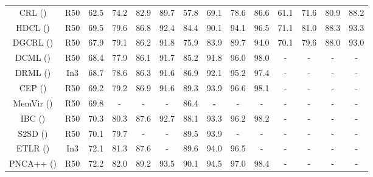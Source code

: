 \documentclass[letterpaper]{article} %
\begin{document}
\begin{table}
\begin{tabular}{c|c||cccc|cccc|cccc}
CRL (\citeauthor{DBLP:conf/ijcai/ZhengJSWHY18}) & R50& 62.5 & 74.2 & 82.9 &89.7& 57.8& 69.1&78.6&86.6& 61.1& 71.6&80.9&88.2\\
HDCL (\citeauthor{DBLP:journals/ijon/ZengLWZCL21}) & R50& 69.5 & 79.6 & 86.8 &92.4& 84.4& 90.1&94.1&96.5& 71.1& 81.0&88.3&93.3\\
\hline 
\hline
		DGCRL (\citeauthor{DBLP:conf/aaai/ZhengJSZWH19})& R50& 67.9 & 79.1 & 86.2 &91.8& 75.9& 83.9&89.7&94.0& 70.1& 79.6&88.0&93.0\\
		DCML (\citeauthor{DBLP:conf/cvpr/ZhengWL021}) & R50& 68.4 & 77.9 & 86.1 &91.7& 85.2& 91.8&96.0&98.0&-& -& -&-\\
		DRML (\citeauthor{DBLP:conf/iccv/ZhengZL021}) & In3 & 68.7 & 78.6 & 86.3 & 91.6 & 86.9 & 92.1& 95.2& 97.4 & -& -& -&-\\
		CEP (\citeauthor{DBLP:conf/eccv/BoudiafRZGPPA20})& R50&69.2 & 79.2 & 86.9 &91.6& 89.3& 93.9&96.6&98.1&  -& -& -&-\\
		MemVir (\citeauthor{DBLP:conf/iccv/KoGK21}) & R50 & 69.8&-&-&-& 86.4&-&-&-&- &- &- &-\\
	    IBC (\citeauthor{DBLP:conf/icml/SeidenschwarzEL21}) & R50 & 70.3 & 80.3& 87.6& 92.7& 88.1& 93.3& 96.2& 98.2& - &- &- &- \\
		S2SD (\citeauthor{DBLP:conf/icml/RothMOCG21})& R50& 70.1 & 79.7& -&-&89.5& 93.9&-&-&- &- &- &-\\
		ETLR (\citeauthor{DBLP:conf/cvpr/KimKCK21})& In3& 72.1 & 81.3 & 87.6 &-& 89.6& 94.0&96.5&-&-& -& -&- \\
		PNCA++ (\citeauthor{DBLP:conf/eccv/TehDT20})& R50& 72.2 & 82.0 & 89.2 &93.5& 90.1& 94.5&97.0&98.4&-& -& -&-\\
\hline
\hline 



\end{tabular}
\end{table}
\end{document}
